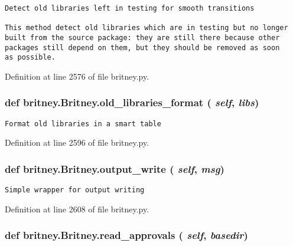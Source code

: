 \footnotesize\begin{verbatim}Detect old libraries left in testing for smooth transitions

This method detect old libraries which are in testing but no longer
built from the source package: they are still there because other
packages still depend on them, but they should be removed as soon
as possible.
\end{verbatim}
\normalsize
 

Definition at line 2576 of file britney.py.
\subsubsection{\setlength{\rightskip}{0pt plus 5cm}def britney.Britney.old\_\-libraries\_\-format ( {\em self},  {\em libs})}\label{classbritney_1_1Britney_7c45f1c5b1dbd442fb9b85fef3fe1823}




\footnotesize\begin{verbatim}Format old libraries in a smart table\end{verbatim}
\normalsize
 

Definition at line 2596 of file britney.py.
\subsubsection{\setlength{\rightskip}{0pt plus 5cm}def britney.Britney.output\_\-write ( {\em self},  {\em msg})}\label{classbritney_1_1Britney_b0406f20fbbbb08cd3c6e5e6b35f77d5}




\footnotesize\begin{verbatim}Simple wrapper for output writing\end{verbatim}
\normalsize
 

Definition at line 2608 of file britney.py.
\subsubsection{\setlength{\rightskip}{0pt plus 5cm}def britney.Britney.read\_\-approvals ( {\em self},  {\em basedir})}\label{classbritney_1_1Britney_39248f0cfea1c8798b2ca5a97d37eaf8}




